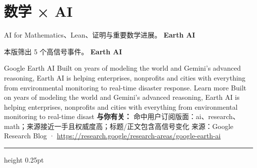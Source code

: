 \documentclass[10.5pt]{ctexart}
\begin{document}
\section*{数学 × AI}
{\color{ormuted} AI for Mathematics、Lean、证明与重要数学进展。}
\vspace{2mm}
{\LARGE\bfseries Earth AI}\par
\vspace{1mm}
{\color{ormuted} 本版筛出 5 个高信号事件。}
\vspace{3mm}
{\Large\bfseries Earth AI}\par
Google Earth AI Built on years of modeling the world and Gemini’s advanced reasoning, Earth AI is helping enterprises, nonprofits and cities with everything from environmental monitoring to real-time disaster response. Learn more Built on years of modeling the world and Gemini’s advanced reasoning, Earth AI is helping enterprises, nonprofits and cities with everything from environmental monitoring to real-time disast
\textbf{与你有关：} 命中用户订阅版面：ai、research、math；来源接近一手且权威度高；标题/正文包含高信号变化
{\footnotesize\color{ormuted} 来源：Google Research Blog · \url{https://research.google/research-areas/google-earth-ai}}
\vspace{4mm}
\hrule height 0.25pt
\vspace{3mm}
\end{document}
